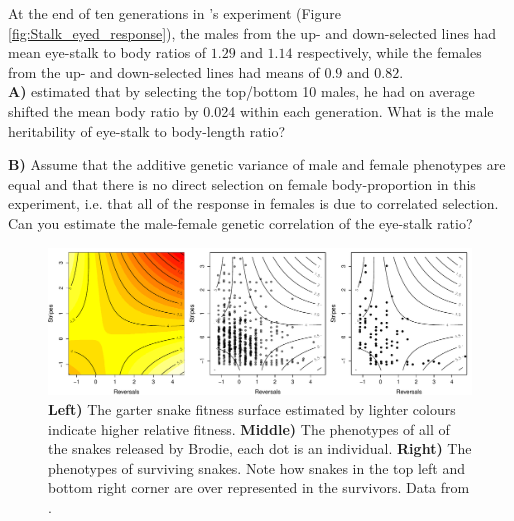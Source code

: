 \begin{question}

At the end of ten generations in \citeauthor{wilkinson:93}'s experiment (Figure
\ref{fig:Stalk_eyed_response}), the males from the up- and down-selected
lines had mean eye-stalk to body ratios of $1.29$ and $1.14$
respectively, while the females from the up- and down-selected lines
had means of $0.9$ and $0.82$. \\
{\bf A)} \citeauthor{wilkinson:93} estimated that by selecting the top/bottom 10 males, he had on average shifted the mean body ratio by 0.024 within
each generation. What is the male heritability of eye-stalk to body-length ratio?

{\bf B)} Assume that the additive genetic variance of male and female phenotypes are
equal and that there is no direct
selection on female body-proportion in this experiment, i.e. that all of
the response in females is due to correlated selection. Can you
estimate the male-female genetic correlation of the eye-stalk ratio? 
\end{question}

\begin{figure}
\begin{center} 
\includegraphics[width= \textwidth]{Journal_figs/Quant_gen/Garter_snakes_Brodie/Garter_snakes_Brodie.pdf}
\end{center}
\caption{ {\bf Left)} The garter snake fitness surface estimated by \citet{brodie1992correlational}
 lighter colours indicate higher
 relative fitness. {\bf Middle)} The phenotypes of all of the snakes released
   by Brodie, each dot is an individual. {\bf Right)} The phenotypes
   of surviving snakes. Note how snakes in the top left and bottom
   right corner are over represented in the survivors. Data from  \citet{brodie1992correlational}
  . } \label{fig:Garter_snakes_Brodie}
\end{figure} 

